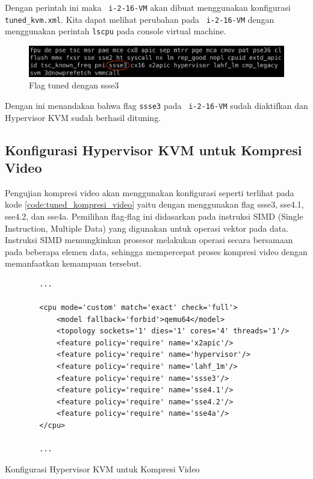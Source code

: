 Dengan perintah ini maka \vm\ \texttt{i-2-16-VM} akan dibuat menggunakan konfigurasi \texttt{tuned\_kvm.xml}. Kita dapat melihat perubahan pada \vm\ \texttt{i-2-16-VM} dengan menggunakan perintah \texttt{lscpu} pada console virtual machine.

\begin{figure}
    \centering
    \includegraphics[width=1\textwidth]
    {assets/pics/lscpu_ssse3.jpeg}
    \caption{Flag tuned dengan ssse3}
    \label{fig:lscpu_ssse3}
\end{figure}

Dengan ini menandakan bahwa flag \texttt{ssse3} pada \vm\ \texttt{i-2-16-VM} sudah diaktifkan dan Hypervisor KVM sudah berhasil dituning.

\subsection{Konfigurasi Hypervisor KVM untuk Kompresi Video}
Pengujian kompresi video akan menggunakan konfigurasi seperti terlihat pada kode \ref{code:tuned_kompresi_video} yaitu dengan menggunakan flag ssse3, sse4.1, sse4.2, dan sse4a. Pemilihan flag-flag ini didasarkan pada instruksi SIMD (Single Instruction, Multiple Data) yang digunakan untuk operasi vektor pada data. Instruksi SIMD memungkinkan prosesor melakukan operasi secara bersamaan pada beberapa elemen data, sehingga mempercepat proses kompresi video dengan memanfaatkan kemampuan tersebut.

\begin{listing}[H]
    \begin{verbatim}
        ...

        <cpu mode='custom' match='exact' check='full'>
            <model fallback='forbid'>qemu64</model>
            <topology sockets='1' dies='1' cores='4' threads='1'/>
            <feature policy='require' name='x2apic'/>
            <feature policy='require' name='hypervisor'/> 
            <feature policy='require' name='lahf_1m'/>
            <feature policy='require' name='ssse3'/>
            <feature policy='require' name='sse4.1'/>
            <feature policy='require' name='sse4.2'/>
            <feature policy='require' name='sse4a'/>
        </cpu>
        
        ...
    \end{verbatim}
    \caption{Konfigurasi Hypervisor KVM untuk Kompresi Video}
    \label{code:tuned_kompresi_video}
\end{listing}

